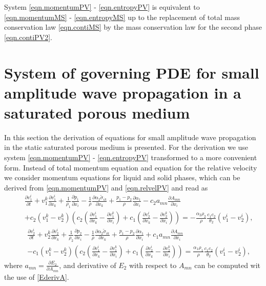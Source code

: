 \documentclass[3p,times]{elsarticle}
\begin{document}
System \eqref{eqn.momentumPV} - \eqref{eqn.entropyPV} is equivalent to \eqref{eqn.momentumMS} - \eqref{eqn.entropyMS} up to the replacement of total mass conservation law \eqref{eqn.contiMS} by the mass conservation law for the second phase \eqref{eqn.contiPV2}.
 
\section{System of governing PDE for small amplitude wave propagation in a saturated porous medium}

In this section the derivation of equations for small amplitude wave propagation in the static saturated porous medium is presented. For the derivation we use system \eqref{eqn.momentumPV} - \eqref{eqn.entropyPV} transformed to a more convenient form. Instead of total momentum equation and equation for the relative velocity we consider momentum equations for liquid and solid phases, which can be derived from \eqref{eqn.momentumPV} and \eqref{eqn.relvelPV} and read as
\begin{eqnarray}\label{eqns.momentum1.quasilinear}
&&\frac{\partial v^i_1}{\partial t}+v^k_1\frac{\partial v^i_1}{\partial x_k}+
\frac{1}{\rho_1}\frac{\partial p_1}{\partial x_i}- \frac{1}{\rho}
\frac{\partial \alpha_2 \tilde \sigma_{ik}}{\partial x_k}+\frac{p_1-p_2}{\rho}\frac{\partial \alpha_1}{\partial x_i} 
-c_2a_{mn}\frac{\partial A_{mn}}{\partial x_i}\\ \nonumber
&&+c_2(v^k_1-v^k_2)\left(c_2\left(\frac{\partial v^i_1}{\partial x_k}-\frac{\partial v^k_1}{\partial x_i}\right)+c_1\left(\frac{\partial v^i_2}{\partial x_k}-\frac{\partial v^k_2}{\partial x_i}\right) \right)
=-\frac{\alpha_2 \rho_2}{\rho} \frac{c_1c_2}{\theta_2}(v_1^i-v_2^i),
\end{eqnarray}
\begin{eqnarray} \label{eqns.momentum2.quasilinear}
&&\frac{\partial v^i_2}{\partial t}+v^k_2\frac{\partial v^i_2}{\partial x_k}+
\frac{1}{\rho_2}\frac{\partial p_2}{\partial x_i}- \frac{1}{\rho}
\frac{\partial \alpha_2 \tilde \sigma_{ik}}{\partial x_k}+\frac{p_1-p_2}{\rho}\frac{\partial \alpha_1}{\partial x_i} 
+c_1a_{mn}\frac{\partial A_{mn}}{\partial x_i}\\ \nonumber
&&-c_1(v^k_1-v^k_2)\left(c_2\left(\frac{\partial v^i_1}{\partial x_k}-\frac{\partial v^k_1}{\partial x_i}\right)+c_1\left(\frac{\partial v^i_2}{\partial x_k}-\frac{\partial v^k_2}{\partial x_i}\right) \right)
=\frac{\alpha_1 \rho_1}{\rho} \frac{c_1c_2}{\theta_2}(v_1^i-v_2^i),
\end{eqnarray}
where $a_{mn}=\frac{\partial E_2}{\partial A_{mn}}$, and derivative of $E_2$ with respect to $A_{mn}$ can be computed wit the use of \eqref{EderivA}.
\end{document}
